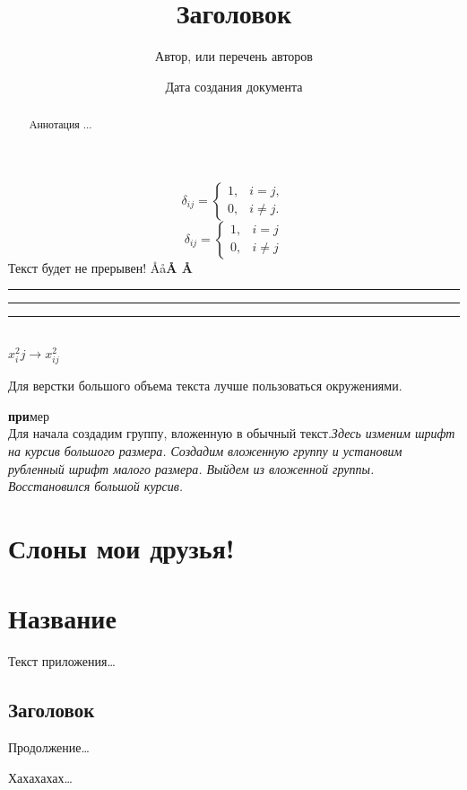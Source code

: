 \documentclass[oneside,a4paper,14pt]{extarticle}
\begin{document}
$$ 
    \delta_{ij} =
    \begin{cases}
        1, & i=j,\\
        0, & i\ne j.
    \end{cases}
$$
$$\delta_{ij}=\begin{cases}1,&i=j\\0,&i\ne j\end{cases}$$
\noindent
Текст %
будет не %
прерывен! %
\AA \aa \bf\AA
\textbf\AA
\rule[5pt]{25pt}{1pt} \rule[-5pt]{1pt}{10pt} \rule{6pt}{6pt}\\
$x^2_ij \to x^2_{ij}$\\
\begin{itshape}
    Для верстки большого объема текста лучше пользоваться окружениями.
\end{itshape}
\textbf{при}мер\\
{Для начала создадим группу, вложенную в обычный текст.\it \large Здесь изменим шрифт на курсив большого размера. {\sf\small Создадим вложенную группу и установим рубленный шрифт малого размера.} Выйдем из вложенной группы. Восстановился большой курсив.}\\

\newpage
\title{Заголовок}
\author{Автор, или перечень авторов}
\date{Дата создания документа}
    \begin{abstract}
        Аннотация ...
    \end{abstract}
\maketitle

\section[О друзьях]{Слоны мои друзья!}\label{s:слоны}

\appendix
\section{Название}\label{}
Текст приложения\dots
\subsection{Заголовок}\label{}
Продолжение\dots

Хахахахах\dots\footnotemark[1]

\end{document}
